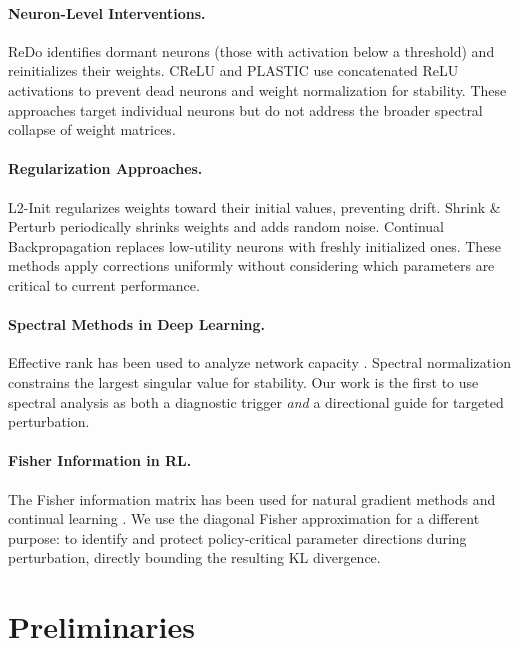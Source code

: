 \documentclass{article}
\begin{document}
\paragraph{Neuron-Level Interventions.}
ReDo \citep{sokar2023dormant} identifies dormant neurons (those with activation below a threshold) and reinitializes their weights. CReLU and PLASTIC \citep{lyle2024disentangling} use concatenated ReLU activations to prevent dead neurons and weight normalization for stability. These approaches target individual neurons but do not address the broader spectral collapse of weight matrices.

\paragraph{Regularization Approaches.}
L2-Init \citep{kumar2023maintaining} regularizes weights toward their initial values, preventing drift. Shrink \& Perturb \citep{ash2020warm} periodically shrinks weights and adds random noise. Continual Backpropagation \citep{dohare2024loss} replaces low-utility neurons with freshly initialized ones. These methods apply corrections uniformly without considering which parameters are critical to current performance.

\paragraph{Spectral Methods in Deep Learning.}
Effective rank \citep{roy2007effective} has been used to analyze network capacity \citep{yang2023spectral}. Spectral normalization \citep{miyato2018spectral} constrains the largest singular value for stability. Our work is the first to use spectral analysis as both a diagnostic trigger \emph{and} a directional guide for targeted perturbation.

\paragraph{Fisher Information in RL.}
The Fisher information matrix has been used for natural gradient methods \citep{kakade2001natural,schulman2015trust} and continual learning \citep{kirkpatrick2017overcoming}. We use the diagonal Fisher approximation for a different purpose: to identify and protect policy-critical parameter directions during perturbation, directly bounding the resulting KL divergence.


\section{Preliminaries}
\label{sec:prelim}
\end{document}
